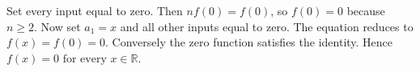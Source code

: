 Set every input equal to zero. Then $nf(0)=f(0)$, so $f(0)=0$ because $n\ge2$. Now set $a_1=x$ and all other inputs equal to zero. The equation reduces to $f(x)=f(0)=0$. Conversely the zero function satisfies the identity. Hence $\boxed{f(x)=0\text{ for every }x\in\mathbb R}$.
